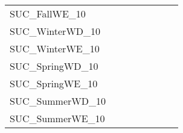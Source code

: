 \begin{table}[H]
{\begin{tabular}{|l|ll|ll|l|l|l|}
			SUC\_FallWE\_10                &                                 &                                &                                  &                                 &                                    &                            &                            \\
			SUC\_WinterWD\_10              &                                 &                                &                                  &                                 &                                    &                            &                            \\
			SUC\_WinterWE\_10              &                                 &                                &                                  &                                 &                                    &                            &                            \\
			SUC\_SpringWD\_10              &                                 &                                &                                  &                                 &                                    &                            &                            \\
			SUC\_SpringWE\_10              &                                 &                                &                                  &                                 &                                    &                            &                            \\
			SUC\_SummerWD\_10              &                                 &                                &                                  &                                 &                                    &                            &                            \\
			SUC\_SummerWE\_10              &                                 &                                &                                  &                                 &                                    &                            &                            \\ \hline
		\end{tabular}%
	}
\end{table}

